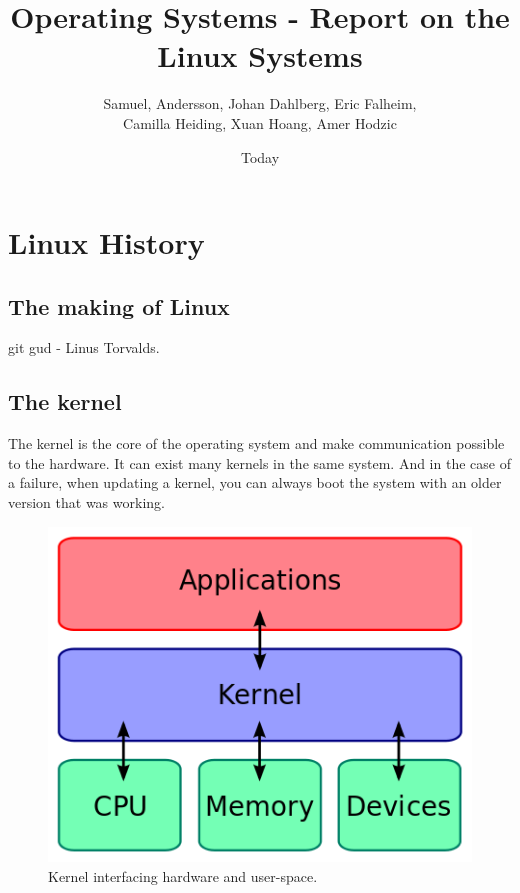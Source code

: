 \documentclass[12pt]{article}
\begin{document}
\title{Operating Systems - Report on the Linux Systems}
\author{Samuel, Andersson, Johan Dahlberg, Eric Falheim, \\Camilla Heiding, Xuan Hoang, Amer Hodzic}
\date{Today}
\maketitle

\newpage
\tableofcontents
\newpage

\section{Linux History} %
\subsection{The making of Linux}
git gud - Linus Torvalds. 
 
\subsection{The kernel}
The kernel is the core of the operating system and make communication possible to the hardware.
It can exist many kernels in the same system. And in the case of a failure, when updating a kernel,
you can always boot the system with an older version that was working.

\begin{figure}[h]
  \begin{center}
    \includegraphics[scale=0.5]{imgs/structure}
    \caption{Kernel interfacing hardware and user-space.}
  \end{center}
\end{figure}
\end{document}
